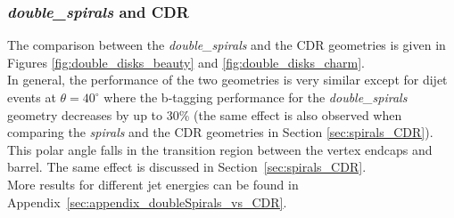 \subsubsection{\emph{double\_spirals} and CDR}
The comparison between the \textit{double\_spirals} and the CDR geometries is given in Figures \ref{fig:double_disks_beauty} and \ref{fig:double_disks_charm}. \\
In general, the performance of the two geometries is very similar except for dijet events at $\theta=40^\circ$ where the b-tagging performance for the \textit{double\_spirals} geometry decreases by up to 30\% (the same effect is also observed when comparing the \textit{spirals} and the CDR geometries in Section \ref{sec:spirals_CDR}). This polar angle falls in the transition region between the vertex endcaps and barrel. The same effect is discussed in Section~\ref{sec:spirals_CDR}. \\
More results for different jet energies can be found in Appendix~\ref{sec:appendix_doubleSpirals_vs_CDR}.

